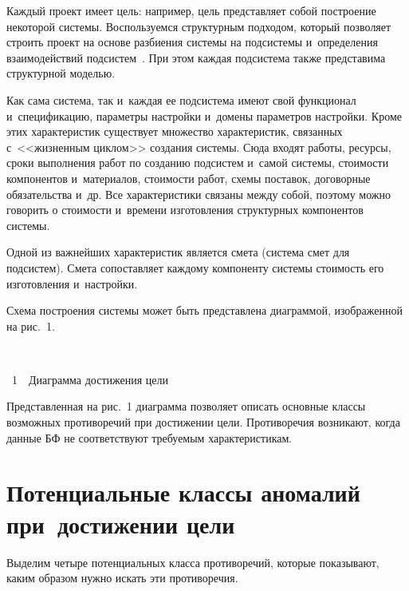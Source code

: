 \begin{multicols}{2}
  Каждый проект имеет цель: например, цель представляет собой построение 
некоторой системы. Воспользуемся структурным подходом, который позволяет 
строить проект на основе разбиения системы на подсистемы и~определения 
взаимодействий подсистем~\cite{7-gr}. При этом каждая подсистема также 
представима структурной моделью. 
  
  Как сама система, так и~каждая ее подсистема имеют свой функционал 
и~спецификацию, па\-ра\-мет\-ры настройки и~домены параметров настройки. Кроме 
этих характеристик существует множество характеристик, связанных 
с~<<жизненным циклом>> создания системы. Сюда входят работы, ресурсы, 
сроки выполнения работ по созданию подсистем и~самой системы, стоимости 
компонентов и~материалов, стоимости работ, схемы поставок, договорные 
обязательства и~др. Все характеристики связаны между собой, поэтому можно 
говорить о стоимости и~времени изготовления структурных компонентов системы. 
  
  Одной из важнейших характеристик является смета (система смет для 
подсистем). Смета сопоставляет каждому компоненту системы стоимость его 
изготовления и~настройки. 
  
  Схема построения системы может быть пред\-став\-ле\-на диаграммой, 
изображенной на рис.~1. 

{ \begin{center}  %
 \vspace*{9pt}
   \mbox{%
 \epsfxsize=79mm 
 }


\vspace*{9pt}


\noindent
{{\figurename~1}\ \ \small{Диаграмма достижения цели}}
\end{center}
}

\vspace*{9pt}

\addtocounter{figure}{1}
  
  


  Представленная на рис.~1 диаграмма позволяет описать основные классы 
возможных противоречий при достижении цели. Противоречия возникают, когда 
данные БФ не соответствуют требуемым характеристикам. 
  
  
  \section{Потенциальные классы аномалий при~достижении цели}
  
  Выделим четыре потенциальных класса противоречий, которые показывают, 
каким образом нужно искать эти противоречия.
  

\end{multicols}
